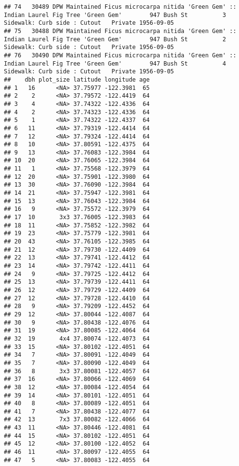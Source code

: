 \documentclass[
]{article}
\begin{document}
\begin{verbatim}
## 74   30489 DPW Maintained Ficus microcarpa nitida 'Green Gem' :: Indian Laurel Fig Tree 'Green Gem'        947 Bush St          3 Sidewalk: Curb side : Cutout   Private 1956-09-05
## 75   30488 DPW Maintained Ficus microcarpa nitida 'Green Gem' :: Indian Laurel Fig Tree 'Green Gem'        947 Bush St          2 Sidewalk: Curb side : Cutout   Private 1956-09-05
## 76   30490 DPW Maintained Ficus microcarpa nitida 'Green Gem' :: Indian Laurel Fig Tree 'Green Gem'        947 Bush St          4 Sidewalk: Curb side : Cutout   Private 1956-09-05
##    dbh plot_size latitude longitude age
## 1   16      <NA> 37.75977 -122.3981  65
## 2    2      <NA> 37.79572 -122.4419  64
## 3    4      <NA> 37.74322 -122.4336  64
## 4    2      <NA> 37.74323 -122.4336  64
## 5    1      <NA> 37.74322 -122.4337  64
## 6   11      <NA> 37.79319 -122.4414  64
## 7   12      <NA> 37.79324 -122.4414  64
## 8   10      <NA> 37.80591 -122.4375  64
## 9   13      <NA> 37.76083 -122.3984  64
## 10  20      <NA> 37.76065 -122.3984  64
## 11   1      <NA> 37.75568 -122.3979  64
## 12  20      <NA> 37.75901 -122.3980  64
## 13  30      <NA> 37.76090 -122.3984  64
## 14  21      <NA> 37.75947 -122.3981  64
## 15  13      <NA> 37.76043 -122.3984  64
## 16   9      <NA> 37.75572 -122.3979  64
## 17  10       3x3 37.76005 -122.3983  64
## 18  11      <NA> 37.75852 -122.3982  64
## 19  23      <NA> 37.75779 -122.3981  64
## 20  43      <NA> 37.76105 -122.3985  64
## 21  12      <NA> 37.79730 -122.4409  64
## 22  13      <NA> 37.79741 -122.4412  64
## 23  14      <NA> 37.79742 -122.4411  64
## 24   9      <NA> 37.79725 -122.4412  64
## 25  13      <NA> 37.79739 -122.4411  64
## 26  12      <NA> 37.79729 -122.4409  64
## 27  12      <NA> 37.79728 -122.4410  64
## 28   9      <NA> 37.79209 -122.4452  64
## 29  12      <NA> 37.80044 -122.4087  64
## 30   9      <NA> 37.80438 -122.4076  64
## 31  19      <NA> 37.80085 -122.4064  64
## 32  19       4x4 37.80074 -122.4073  64
## 33  15      <NA> 37.80102 -122.4051  64
## 34   7      <NA> 37.80091 -122.4049  64
## 35   7      <NA> 37.80090 -122.4049  64
## 36   8       3x3 37.80081 -122.4057  64
## 37  16      <NA> 37.80066 -122.4069  64
## 38  12      <NA> 37.80084 -122.4054  64
## 39  14      <NA> 37.80101 -122.4051  64
## 40   8      <NA> 37.80089 -122.4051  64
## 41   7      <NA> 37.80438 -122.4077  64
## 42  13       7x3 37.80082 -122.4066  64
## 43  11      <NA> 37.80446 -122.4081  64
## 44  15      <NA> 37.80102 -122.4051  64
## 45  12      <NA> 37.80100 -122.4052  64
## 46  11      <NA> 37.80097 -122.4055  64
## 47   5      <NA> 37.80083 -122.4055  64

\end{verbatim}
\end{document}
